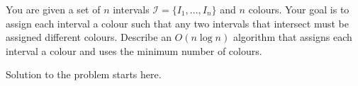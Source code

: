 \documentclass{article}
\begin{document}
\begin{question}
You are given a set of $n$ intervals $\mathcal I = \{I_1, \dots, I_n\}$ and $n$ colours. Your goal is to assign each interval a colour such that any two intervals that intersect must be assigned different colours. Describe an $O(n \log n)$ algorithm that assigns each interval a colour and uses the minimum number of colours.
\end{question}

\begin{solution}
Solution to the problem starts here.
\end{solution}
\end{document}
